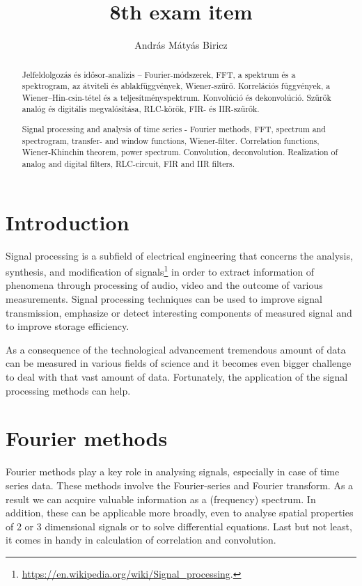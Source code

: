 \documentclass[12pt]{article}
\theoremstyle{plain}
\begin{document}
\title{8th exam item}
\author{András Mátyás Biricz}

\maketitle


\newpage
\begin{abstract}
    Jelfeldolgozás és idősor-analízis – Fourier-módszerek, FFT, a spektrum és a spektrogram, az átviteli és ablakfüggvények, Wiener-szűrő. Korrelációs függvények, a Wiener–Hin-csin-tétel és a teljesítményspektrum. Konvolúció és dekonvolúció. Szűrők analóg és digitális megvalósítása, RLC-körök, FIR- és IIR-szűrők.

	Signal processing and analysis of time series - Fourier methods, FFT, spectrum and spectrogram, transfer- and window functions, Wiener-filter. Correlation functions, Wiener-Khinchin theorem, power spectrum. Convolution, deconvolution. Realization of analog and digital filters, RLC-circuit, FIR and IIR filters. 

\end{abstract}

\section{Introduction}

Signal processing is a subfield of electrical engineering that concerns the analysis, synthesis, and modification of signals\footnote{\url{https://en.wikipedia.org/wiki/Signal_processing}.} in order to extract information of phenomena through processing of audio, video and the outcome of various measurements. Signal processing techniques can be used to improve signal transmission, emphasize or detect interesting components of measured signal and to improve storage efficiency. 

As a consequence of the technological advancement tremendous amount of data can be measured in various fields of science and it becomes even bigger challenge to deal with that vast amount of data. Fortunately, the application of the signal processing methods can help.

\section{Fourier methods}

Fourier methods play a key role in analysing signals, especially in case of time series data. These methods involve the Fourier-series and Fourier transform. As a result we can acquire valuable information as a (frequency) spectrum. In addition, these can be applicable more broadly, even to analyse spatial properties of 2 or 3 dimensional signals or to solve differential equations. Last but not least, it comes in handy in calculation of correlation and convolution.
\end{document}
